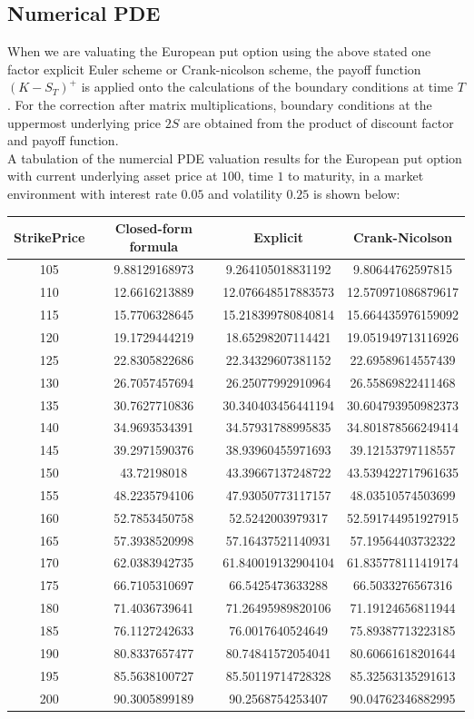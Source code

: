 \subsection{Numerical PDE}
When we are valuating the European put option using the above stated one factor explicit Euler scheme or Crank-nicolson scheme, the payoff function $(K - S_{T})^{+}$ is applied onto the calculations of the boundary conditions at time $T$. For the correction after matrix multiplications, boundary conditions at the uppermost underlying price $2S$ are obtained from the product of discount factor and payoff function.\\[1mm]
A tabulation of the numercial PDE valuation results for the European put option with current underlying asset price at $100$, time $1$ to maturity, in a market environment with interest rate $0.05$ and volatility $0.25$ is shown below:
\begin{center}
\begin{tabular}{|c|c|c|c|}
\hline
StrikePrice & Closed-form formula & Explicit & Crank-Nicolson\\
\hline
105&9.88129168973 & 9.264105018831192 &   9.80644762597815 \\
110&12.6616213889 & 12.076648517883573 &  12.570971086879617\\
115&15.7706328645 & 15.218399780840814 &  15.664435976159092\\
120&19.1729444219 & 18.65298207114421 &   19.051949713116926\\
125&22.8305822686 & 22.34329607381152 &   22.69589614557439 \\
130&26.7057457694 & 26.25077992910964 &   26.55869822411468 \\
135&30.7627710836 & 30.340403456441194 &  30.604793950982373\\
140&34.9693534391 & 34.57931788995835 &   34.801878566249414\\
145&39.2971590376 & 38.93960455971693 &   39.12153797118557 \\
150&43.72198018    & 43.39667137248722 &   43.539422717961635\\
155&48.2235794106 & 47.93050773117157 &   48.03510574503699 \\
160&52.7853450758 & 52.5242003979317 &    52.591744951927915\\
165&57.3938520998 & 57.16437521140931 &   57.19564403732322 \\
170&62.0383942735 & 61.840019132904104 &  61.835778111419174\\
175&66.7105310697 & 66.5425473633288 &    66.5033276567316 \\
180&71.4036739641 & 71.26495989820106 &   71.19124656811944 \\
185&76.1127242633 & 76.0017640524649 &    75.89387713223185 \\
190&80.8337657477 & 80.74841572054041 &   80.60661618201644 \\
195&85.5638100727 & 85.50119714728328 &   85.32563135291613 \\
200&90.3005899189 & 90.2568754253407 &    90.04762346882995 \\
\hline
\end{tabular}
\end{center}
